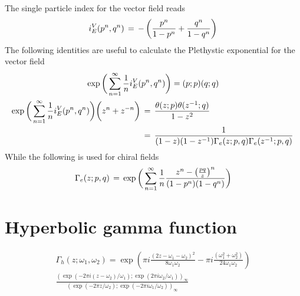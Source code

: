 \begin{appendices}
The single particle index for the vector field reads
\begin{equation}
   i_E^V(p^n,q^n) \, = \, - \left( {p^n \over 1-p^n} + {q^n \over 1-q^n} \right)
\end{equation}
The following identities are useful to calculate the Plethystic exponential for the vector field
\begin{gather}
  \exp \bigg( \sum_{n=1}^{\infty} {1 \over n} i_E^{V} (p^n,q^n) \bigg)  = (p;p) (q;q) 
 \label{eqn:elliptic_index_vector_zero_modes_identity}
 \\
\begin{aligned}
\exp \bigg( \sum_{n=1}^{\infty} {1 \over n} i_E^{V} (p^n,q^n) \bigg) \bigg( z^n + z^{-n} \bigg) \,& =
\,  \frac{ \theta ( z;p) \theta (z^{-1};q) }{ 1-z^2 } \\
& =  \, \frac{1}{ ( 1 - z ) ( 1 - z^{-1}) \Gamma_e( z;p,q) \Gamma_e( z^{-1}; p,q)} \,
\label{eqn:elliptic_index_vector_adjoint}
\end{aligned}
\end{gather}
While the following is used for chiral fields
\begin{equation}
\Gamma_e(z;p,q) \, = \, \exp \bigg( \sum_{n=1}^{\infty} {1 \over n }
 \frac{ z^n - \big( {pq \over z} \big)^n }{(1-p^n) ( 1-q^n)} \bigg)
 \label{eqn:elliptic_gamma_chiral_identity}
\end{equation}


\section{Hyperbolic gamma function}
\begin{multline}
 \Gamma_h ( z;\omega_1, \omega_2) = \exp \left( \pi i \frac{(2z-\omega_1 - \omega_2)^2}{8 \omega_1 \omega_2 } - \pi i \frac{(\omega_1^2 + \omega_2^2)}{ 24 \omega_1 \omega_2} \right)
 \\ \frac{ \left( \exp( -2 \pi i (z-\omega_2)/ \omega_1 ); \exp( 2 \pi i \omega_2 / \omega_1 ) \right)_{\infty}}
 { \left (\exp( -2 \pi z / \omega_2 ); \exp( - 2 \pi i \omega_1 / \omega_2) \right)_{\infty}}
 \end{multline}


\end{appendices}
